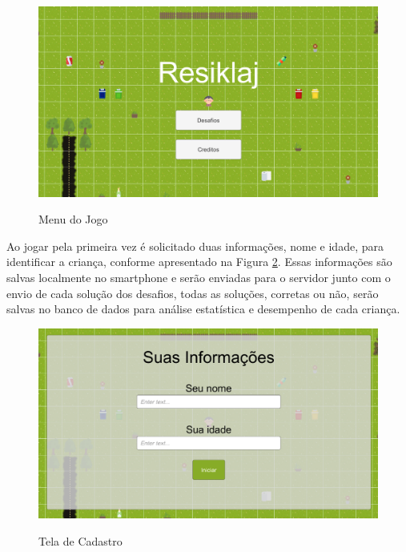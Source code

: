     \begin{figure}[H]
        \caption{Menu do Jogo}
        \centering
        \includegraphics[width=14cm]{Imagens/Cap4/menu_final.png}
        \label{figura:menu_final}
    \end{figure}
    
    Ao jogar pela primeira vez é solicitado duas informações, nome e idade, para identificar a criança, conforme apresentado na Figura \ref{figura:tela_final_cadastro}. Essas informações são salvas localmente no smartphone e serão enviadas para o servidor junto com o envio de cada solução dos desafios, todas as soluções, corretas ou não, serão salvas no banco de dados para análise estatística e desempenho de cada criança.
    
    \begin{figure}[H]
        \caption{Tela de Cadastro}
        \centering
        \includegraphics[width=14cm]{Imagens/Cap4/tela_final_cadastro.png}
        \label{figura:tela_final_cadastro}
    \end{figure}
    
